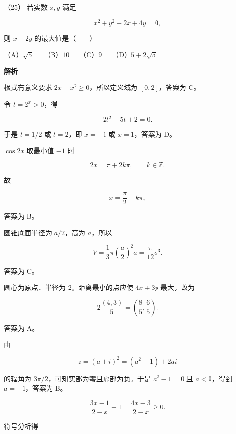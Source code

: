 \begin{answer}
（25） 若实数 $x,y$ 满足

\nopagebreak[4]
\[
x^2+y^2-2x+4y=0,
\]

则 $x-2y$ 的最大值是\mbox{（　　）}

（A）$\sqrt5$　　（B）$10$　　（C）$9$　　（D）$5+2\sqrt5$

\textbf{解析}


根式有意义要求 $2x-x^2\ge0$，所以定义域为 $[0,2]$，答案为 C。


令 $t=2^x>0$，得

\nopagebreak[4]
\[
2t^2-5t+2=0.
\]

于是 $t=1/2$ 或 $t=2$，即 $x=-1$ 或 $x=1$，答案为 D。


$\cos2x$ 取最小值 $-1$ 时

\nopagebreak[4]
\[
2x=\pi+2k\pi,\qquad k\in\mathbb Z.
\]

故

\nopagebreak[4]
\[
x=\frac\pi2+k\pi,
\]

答案为 B。


圆锥底面半径为 $a/2$，高为 $a$，所以

\nopagebreak[4]
\[
V=\frac13\pi\left(\frac a2\right)^2a=\frac\pi{12}a^3.
\]

答案为 C。


圆心为原点、半径为 $2$。距离最小的点应使 $4x+3y$ 最大，故为

\nopagebreak[4]
\[
2\frac{(4,3)}5=\left(\frac85,\frac65\right).
\]

答案为 A。


由

\nopagebreak[4]
\[
z=(a+i)^2=(a^2-1)+2ai
\]

的辐角为 $3\pi/2$，可知实部为零且虚部为负。于是 $a^2-1=0$ 且 $a<0$，得到 $a=-1$，答案为 B。


\nopagebreak[4]
\[
\frac{3x-1}{2-x}-1=\frac{4x-3}{2-x}\ge0.
\]

符号分析得


\end{answer}
